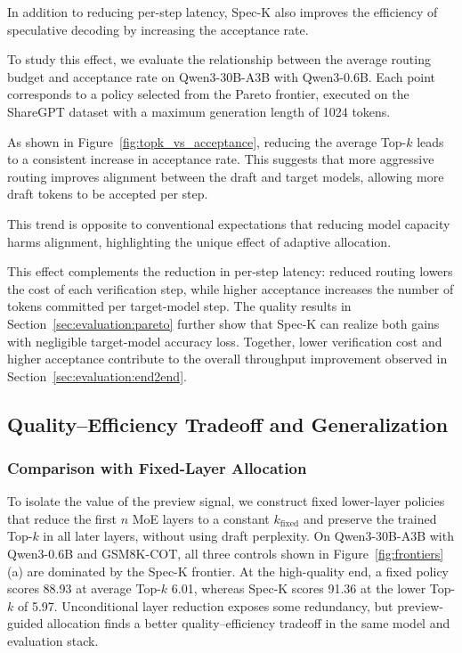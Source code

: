 \documentclass[conference]{IEEEtran}
\theoremstyle{definition} %
\begin{document}
In addition to reducing per-step latency, Spec-K also improves the efficiency of speculative decoding by increasing the acceptance rate.

To study this effect, we evaluate the relationship between the average routing budget and acceptance rate on Qwen3-30B-A3B with Qwen3-0.6B.
Each point corresponds to a policy selected from the Pareto frontier, executed on the ShareGPT dataset with a maximum generation length of 1024 tokens.

As shown in Figure~\ref{fig:topk_vs_acceptance}, reducing the average Top-$k$ leads to a consistent increase in acceptance rate.
This suggests that more aggressive routing improves alignment between the draft and target models, allowing more draft tokens to be accepted per step.

This trend is opposite to conventional expectations that reducing model capacity harms alignment, highlighting the unique effect of adaptive allocation.

This effect complements the reduction in per-step latency: reduced routing lowers the cost of each verification step, while higher acceptance increases the number of tokens committed per target-model step. The quality results in Section~\ref{sec:evaluation:pareto} further show that Spec-K can realize both gains with negligible target-model accuracy loss. Together, lower verification cost and higher acceptance contribute to the overall throughput improvement observed in Section~\ref{sec:evaluation:end2end}.

\subsection{Quality--Efficiency Tradeoff and Generalization}

\subsubsection{Comparison with Fixed-Layer Allocation}

To isolate the value of the preview signal, we construct fixed lower-layer policies that reduce the first $n$ MoE layers to a constant $k_{\mathrm{fixed}}$ and preserve the trained Top-$k$ in all later layers, without using draft perplexity. On Qwen3-30B-A3B with Qwen3-0.6B and GSM8K-COT, all three controls shown in Figure~\ref{fig:frontiers}(a) are dominated by the Spec-K frontier. At the high-quality end, a fixed policy scores 88.93 at average Top-$k$ 6.01, whereas Spec-K scores 91.36 at the lower Top-$k$ of 5.97. Unconditional layer reduction exposes some redundancy, but preview-guided allocation finds a better quality--efficiency tradeoff in the same model and evaluation stack.
\end{document}
